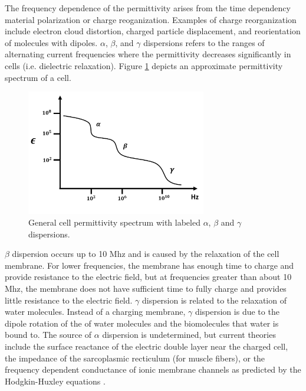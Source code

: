  \par The frequency dependence of the permittivity arises from the time dependency material polarization or charge reoganization. Examples of charge reorganization include electron cloud distortion, charged particle displacement, and reorientation of molecules with dipoles. $\alpha$, $\beta$, and $\gamma$ dispersions refers to the ranges of alternating current frequencies where the permittivity decreases significantly in cells (i.e. dielectric relaxation). Figure \ref{fig:schwan_dispersions} depicts an approximate permittivity spectrum of a cell.
 
 \begin{figure}[ht]
 \centering
 \includegraphics[width=0.7\textwidth]{images/schwanDispersions.png}
 \caption[General cell permittivity spectrum]{General cell permittivity spectrum with labeled $\alpha$, $\beta$ and $\gamma$ dispersions.}
 \label{fig:schwan_dispersions}
 \end{figure}
 
 \par $\beta$ dispersion occurs up to 10 Mhz and is caused by the relaxation of the cell membrane. For lower frequencies, the membrane has enough time to charge and provide resistance to the electric field, but at frequencies greater than about 10 Mhz, the membrane does not have sufficient time to fully charge and provides little resistance to the electric field. $\gamma$ dispersion is related to the relaxation of water molecules. Instead of a charging membrane, $\gamma$ dispersion is due to the dipole rotation of the of water molecules and the biomolecules that water is bound to. The source of $\alpha$ dispersion is undetermined, but current theories include the surface reactance of the electric double layer near the charged cell, the impedance of the sarcoplasmic recticulum (for muscle fibers), or the frequency dependent conductance of ionic membrane channels as predicted by the Hodgkin-Huxley equations \cite{schwan_electrical_1994}.
 
